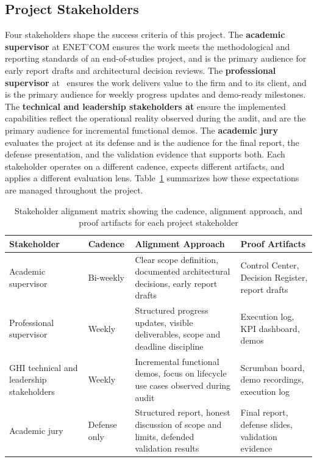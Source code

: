 \subsection*{Project Stakeholders}
Four stakeholders shape the success criteria of this project. The \textbf{academic supervisor} at \mbox{ENET'COM} ensures the work meets the methodological and reporting standards of an end-of-studies project, and is the primary audience for early report drafts and architectural decision reviews. The \textbf{professional supervisor} at \hostCompany\ ensures the work delivers value to the firm and to its client, and is the primary audience for weekly progress updates and demo-ready milestones. The \textbf{technical and leadership stakeholders at \clientCompany} ensure the implemented capabilities reflect the operational reality observed during the audit, and are the primary audience for incremental functional demos. The \textbf{academic jury} evaluates the project at its defense and is the audience for the final report, the defense presentation, and the validation evidence that supports both. Each stakeholder operates on a different cadence, expects different artifacts, and applies a different evaluation lens. Table~\ref{tab:stakeholders} summarizes how these expectations are managed throughout the project.

\begin{table}[H]
\centering
\renewcommand{\arraystretch}{1.4}
\begin{tabular}{|p{3.2cm}|p{2.4cm}|p{4.5cm}|p{4.0cm}|}
\hline
\rowcolor{lightgray}
\textbf{Stakeholder} & \textbf{Cadence} & \textbf{Alignment Approach} & \textbf{Proof Artifacts} \\ \hline
Academic supervisor & Bi-weekly & Clear scope definition, documented architectural decisions, early report drafts & Control Center, Decision Register, report drafts \\ \hline
Professional supervisor & Weekly & Structured progress updates, visible deliverables, scope and deadline discipline & Execution log, KPI dashboard, demos \\ \hline
GHI technical and leadership stakeholders & Weekly & Incremental functional demos, focus on lifecycle use cases observed during audit & Scrumban board, demo recordings, execution log \\ \hline
Academic jury & Defense only & Structured report, honest discussion of scope and limits, defended validation results & Final report, defense slides, validation evidence \\ \hline
\end{tabular}
\caption{Stakeholder alignment matrix showing the cadence, alignment approach, and proof artifacts for each project stakeholder}
\label{tab:stakeholders}
\end{table}

